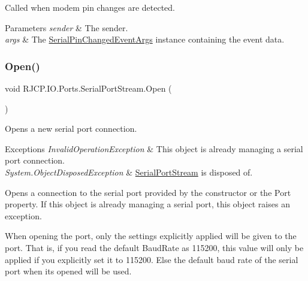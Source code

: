 Called when modem pin changes are detected. 


\begin{DoxyParams}{Parameters}
{\em sender} & The sender.\\
\hline
{\em args} & The \mbox{\hyperlink{class_r_j_c_p_1_1_i_o_1_1_ports_1_1_serial_pin_changed_event_args}{Serial\+Pin\+Changed\+Event\+Args}} instance containing the event data.\\
\hline
\end{DoxyParams}
\mbox{\label{class_r_j_c_p_1_1_i_o_1_1_ports_1_1_serial_port_stream_aea440d3c8584ce6f55dc63e57f473198}} 
\subsubsection{\texorpdfstring{Open()}{Open()}}
{\footnotesize\ttfamily void R\+J\+C\+P.\+I\+O.\+Ports.\+Serial\+Port\+Stream.\+Open (\begin{DoxyParamCaption}{ }\end{DoxyParamCaption})}



Opens a new serial port connection. 


\begin{DoxyExceptions}{Exceptions}
{\em Invalid\+Operation\+Exception} & This object is already managing a serial port connection.\\
\hline
{\em System.\+Object\+Disposed\+Exception} & \mbox{\hyperlink{class_r_j_c_p_1_1_i_o_1_1_ports_1_1_serial_port_stream}{Serial\+Port\+Stream}} is disposed of.\\
\hline
\end{DoxyExceptions}


Opens a connection to the serial port provided by the constructor or the Port property. If this object is already managing a serial port, this object raises an exception. 

When opening the port, only the settings explicitly applied will be given to the port. That is, if you read the default Baud\+Rate as 115200, this value will only be applied if you explicitly set it to 115200. Else the default baud rate of the serial port when its opened will be used.


